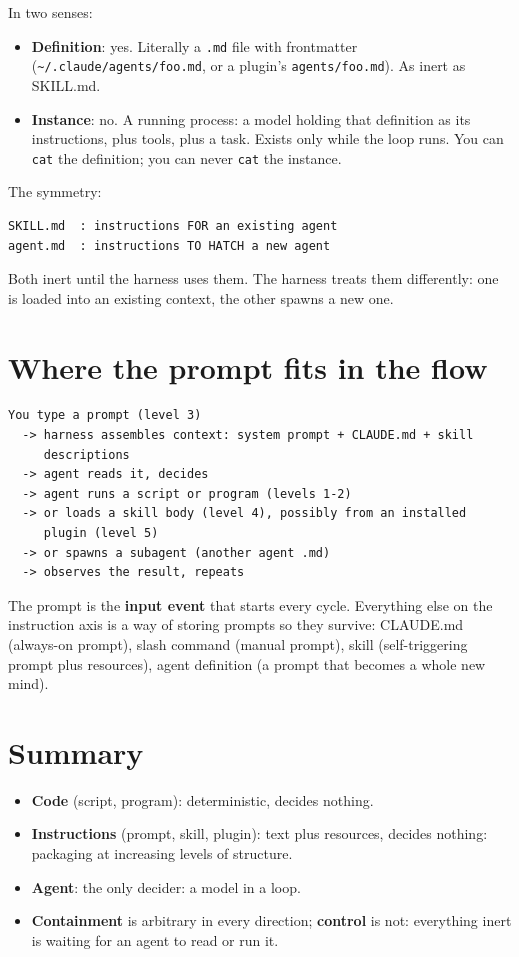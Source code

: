 \documentclass[11pt,a4paper]{article}
\begin{document}
In two senses:

\begin{itemize}
  \item \textbf{Definition}: yes. Literally a \texttt{.md} file with
    frontmatter (\texttt{\textasciitilde/.claude/agents/foo.md}, or a
    plugin's \texttt{agents/foo.md}). As inert as SKILL.md.
  \item \textbf{Instance}: no. A running process: a model holding that
    definition as its instructions, plus tools, plus a task. Exists only
    while the loop runs. You can \texttt{cat} the definition; you can never
    \texttt{cat} the instance.
\end{itemize}

The symmetry:

\begin{verbatim}
SKILL.md  : instructions FOR an existing agent
agent.md  : instructions TO HATCH a new agent
\end{verbatim}

Both inert until the harness uses them. The harness treats them
differently: one is loaded into an existing context, the other spawns a new
one.

\section{Where the prompt fits in the flow}

\begin{verbatim}
You type a prompt (level 3)
  -> harness assembles context: system prompt + CLAUDE.md + skill
     descriptions
  -> agent reads it, decides
  -> agent runs a script or program (levels 1-2)
  -> or loads a skill body (level 4), possibly from an installed
     plugin (level 5)
  -> or spawns a subagent (another agent .md)
  -> observes the result, repeats
\end{verbatim}

The prompt is the \textbf{input event} that starts every cycle. Everything
else on the instruction axis is a way of storing prompts so they survive:
CLAUDE.md (always-on prompt), slash command (manual prompt), skill
(self-triggering prompt plus resources), agent definition (a prompt that
becomes a whole new mind).

\section{Summary}

\begin{itemize}
  \item \textbf{Code} (script, program): deterministic, decides nothing.
  \item \textbf{Instructions} (prompt, skill, plugin): text plus resources,
    decides nothing: packaging at increasing levels of structure.
  \item \textbf{Agent}: the only decider: a model in a loop.
  \item \textbf{Containment} is arbitrary in every direction;
    \textbf{control} is not: everything inert is waiting for an agent to
    read or run it.
\end{itemize}
\end{document}
